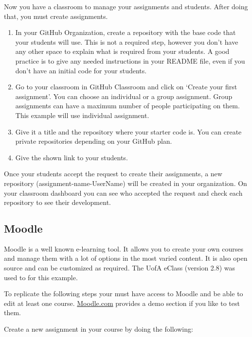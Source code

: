 \documentclass[12pt]{article}
\begin{document}
Now you have a classroom to manage your assignments and students. After doing that, you must create assignments.

\begin{enumerate}

\item In your GitHub Organization, create a repository with the base code that your students will use. This is not a required step, however you don't have any other space to explain what is required from your students. A good practice is to give any needed instructions in your README file, even if you don't have an initial code for your students.

\item Go to your classroom in GitHub Classroom and click on `Create your first assignment'. You can choose an individual or a group assignment. Group assignments can have a maximum number of people participating on them. This example will use individual assignment.

\item Give it a title and the repository where your starter code is. You can create private repositories depending on your GitHub plan.

\item Give the shown link to your students. 

\end{enumerate}

Once your students accept the request to create their assignments, a new repository (assignment-name-UserName) will be created in your organization. On your classroom dashboard you can see who accepted the request and check each repository to see their development.


\subsection{Moodle}

Moodle is a well known e-learning tool. It allows you to create your own courses and manage them with a lot of options in the most varied content. It is also open source and can be customized as required. The UofA eClass (version 2.8) was used to for this example.

To replicate the following steps your must have access to Moodle and be able to edit at least one course. \url{Moodle.com} provides a demo section if you like to test them.

Create a new assignment in your course by doing the following:
\end{document}
